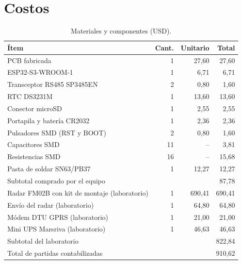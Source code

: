 \documentclass[11pt,a4paper]{article}
\newcommand{\seccion}[1]{\needspace{10\baselineskip}\section{#1}}
\begin{document}
\seccion{Costos}

\begin{table}[H]
    \centering
    \small
    \caption{Materiales y componentes (USD).}
    \begin{tabular}{lrrr}
        \toprule
        \textbf{Ítem} & \textbf{Cant.} & \textbf{Unitario} & \textbf{Total} \\
        \midrule
        PCB fabricada                                & 1  & 27,60 & 27,60 \\
        ESP32-S3-WROOM-1                             & 1  & 6,71  & 6,71 \\
        Transceptor RS485 SP3485EN                   & 2  & 0,80  & 1,60 \\
        RTC DS3231M                                  & 1  & 13,60 & 13,60 \\
        Conector microSD                             & 1  & 2,55  & 2,55 \\
        Portapila y batería CR2032                   & 1  & 2,36  & 2,36 \\
        Pulsadores SMD (RST y BOOT)                  & 2  & 0,80  & 1,60 \\
        Capacitores SMD                              & 11 & --    & 3,81 \\
        Resistencias SMD                             & 16 & --    & 15,68 \\
        Pasta de soldar SN63/PB37                    & 1  & 12,27 & 12,27 \\
        \midrule
        Subtotal comprado por el equipo     &    &       & 87,78 \\
        \midrule
        Radar FM02B con kit de montaje (laboratorio) & 1  & 690,41 & 690,41 \\
        Envío del radar (laboratorio)                & 1  & 64,80  & 64,80 \\
        Módem DTU GPRS (laboratorio)                 & 1  & 21,00  & 21,00 \\
        Mini UPS Marsriva (laboratorio)              & 1  & 46,63  & 46,63 \\
        \midrule
        Subtotal del laboratorio            &    &        & 822,84 \\
        \midrule
        Total de partidas contabilizadas    &    &        & 910,62 \\
        \bottomrule
    \end{tabular}
\end{table}
\end{document}

